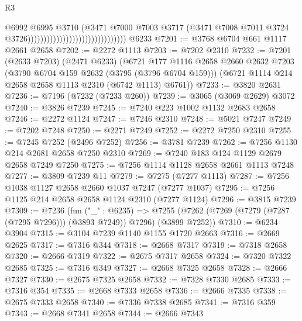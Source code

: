 \begin{lexlean}{R3}
\begin{coremodule}
                                                              @6992
                                                              @6995
                                                              @3710
                                                              (@3471
                                                                @7000
                                                                @7003
                                                                @3717
                                                                (@3471
                                                                  @7008
                                                                  @7011
                                                                  @3724
                                                                  @3726)))))))))))))))))))))))))))))))
    @6233
@7201 := @3768 @6704 @661 @1117 @2661 @2658
@7202 := @2272 @1113
@7203 := @7202 @2310
@7232 := @7201
    (@2633 @7203)
    (@2471 @6233)
    (@6721
      @177
      @1116
      @2658
      @2660
      @2632
      @7203
      (@3790 @6704 @159 @2632 (@3795 (@3796 @6704 @159)))
      (@6721 @1114 @214 @2658 @2658 @1113 @2310 (@6742 @1113) @6761))
@7233 := @3820 @2631
@7236 := @7196 (@7232 (@7233 @260))
@7239 := @3065 (@3069 @2629) @3072
@7240 := @3826 @7239
@7245 := @7240 @223 @1002 @1132 @2683 @2658
@7246 := @2272 @1124
@7247 := @7246 @2310
@7248 := @5021 @7247
@7249 := @7202 @7248
@7250 := @2271 @7249
@7252 := @2272 @7250 @2310
@7255 := @7245 @7252 (@2496 @7252)
@7256 := @3781 @7239
@7262 := @7256 @1130 @214 @2681 @2658 @7250 @2310
@7269 := @7240 @183 @124 @1129 @2679 @2658 @7249 @7250
@7275 := @7256 @1114 @1128 @2658 @2661 @1113 @7248
@7277 := @3809 @7239 @11
@7279 := @7275 (@7277 @1113)
@7287 := @7256 @1038 @1127 @2658 @2660 @1037 @7247 (@7277 @1037)
@7295 := @7256 @1125 @214 @2658 @2658 @1124 @2310 (@7277 @1124)
@7296 := @3815 @7239
@7309 := @7236
    (fun ("_" : @6235) =>
    @7255 (@7262 (@7269 (@7279 (@7287 (@7295 @7296))) (@3893 @7249)) @7296) (@3899 @7252))
@7310 := @6234 @3904
@7315 := @3104 @7239 @1140 @1155 @1720 @2663
@7316 := @2669 @2625
@7317 := @7316 @344
@7318 := @2668 @7317
@7319 := @7318 @2658
@7320 := @2666 @7319
@7322 := @2675 @7317 @2658
@7324 := @7320 @7322 @2685
@7325 := @7316 @349
@7327 := @2668 @7325 @2658
@7328 := @2666 @7327
@7330 := @2675 @7325 @2658
@7332 := @7328 @7330 @2685
@7333 := @7316 @354
@7335 := @2668 @7333 @2658
@7336 := @2666 @7335
@7338 := @2675 @7333 @2658
@7340 := @7336 @7338 @2685
@7341 := @7316 @359
@7343 := @2668 @7341 @2658
@7344 := @2666 @7343

\end{coremodule}
\end{lexlean}
